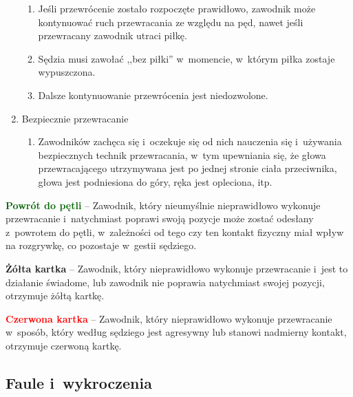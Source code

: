 \documentclass[12pt,a4paper]{article}
\renewcommand{\subsubsection}[1]{
  \oldsubsubsection{#1}%
  \leftskip1.3cm
}
\newcommand\redcard[1]{\bgroup\textcolor{red}{\textbf{#1}}}
\newcommand\yellowcard[1]{\bgroup\textcolor{darkyellow}{\textbf{#1}}}
\newcommand\other[1]{\bgroup\textcolor{darkgreen}{\textbf{#1}}}
\begin{document}
\begin{enumerate}
	      \begin{enumerate}
		      \item
		            Jeśli przewrócenie zostało rozpoczęte prawidłowo, zawodnik może
		            kontynuować ruch przewracania ze względu na pęd, nawet jeśli
		            przewracany zawodnik utraci piłkę.
		      \item
		            Sędzia musi zawołać ,,bez piłki'' w~momencie, w~którym piłka
		            zostaje wypuszczona.
		      \item
		            Dalsze kontynuowanie przewrócenia jest niedozwolone.
	      \end{enumerate}
	\item
	      Bezpiecznie przewracanie

	      \begin{enumerate}
		      \item
		            Zawodników zachęca się i~oczekuje się od nich nauczenia się i~używania bezpiecznych technik przewracania, w~tym upewniania się, że
		            głowa przewracającego utrzymywana jest po jednej stronie ciała przeciwnika,
		            głowa jest podniesiona do góry, ręka jest opleciona, itp.
	      \end{enumerate}
\end{enumerate}

\other{Powrót do pętli} -- Zawodnik, który nieumyślnie nieprawidłowo
wykonuje przewracanie i~natychmiast poprawi swoją pozycje może zostać
odesłany z~powrotem do pętli, w~zależności od tego czy ten kontakt
fizyczny miał wpływ na rozgrywkę, co pozostaje w~gestii sędziego.

\yellowcard{Żółta kartka} -- Zawodnik, który nieprawidłowo wykonuje
przewracanie i~jest to działanie świadome, lub zawodnik nie poprawia
natychmiast swojej pozycji, otrzymuje żółtą kartkę.

\redcard{Czerwona kartka} -- Zawodnik, który nieprawidłowo wykonuje
przewracanie w~sposób, który według sędziego jest agresywny lub stanowi
nadmierny kontakt, otrzymuje czerwoną kartkę.

\subsection{Faule i~wykroczenia}

\subsubsection{Kary dyscyplinarne}
\end{document}
